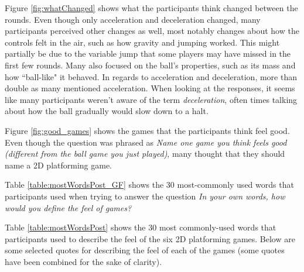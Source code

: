 Figure \ref{fig:whatChanged} shows what the participants think changed between the rounds. Even though only acceleration and deceleration changed, many participants perceived other changes as well, most notably changes about how the controls felt in the air, such as how gravity and jumping worked. This might partially be due to the variable jump that some players may have missed in the first few rounds. Many also focused on the ball's properties, such as its mass and how ``ball-like" it behaved. In regards to acceleration and deceleration, more than double as many mentioned acceleration. When looking at the responses, it seems like many participants weren't aware of the term \textit{deceleration}, often times talking about how the ball gradually would slow down to a halt.

Figure \ref{fig:good_games} shows the games that the participants think feel good. Even though the question was phrased as \textit{Name one game you think feels good (different from the ball game you just played)}, many thought that they should name a 2D platforming game.

Table \ref{table:mostWordsPost_GF} shows the 30 most-commonly used words that participants used when trying to answer the question \textit{In your own words, how would you define the feel of games?}

Table \ref{table:mostWordsPost} shows the 30 most commonly-used words that participants used to describe the feel of the six 2D platforming games. Below are some selected quotes for describing the feel of each of the games (some quotes have been combined for the sake of clarity).

